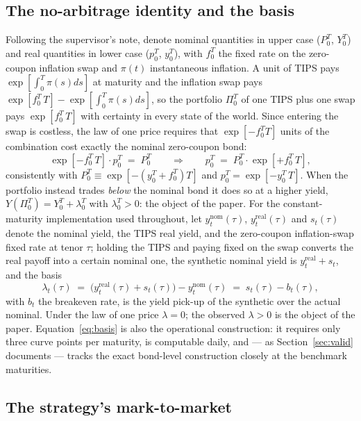 \documentclass[11pt]{article}
\begin{document}
\subsection{The no-arbitrage identity and the basis}

Following the supervisor's note, denote nominal quantities in upper case ($P_0^T$, $Y_0^T$) and real quantities in lower case ($p_0^T$, $y_0^T$), with $f_0^T$ the fixed rate on the zero-coupon inflation swap and $\pi(t)$ instantaneous inflation. A unit of TIPS pays $\exp[\int_0^T\pi(s)ds]$ at maturity and the inflation swap pays $\exp[f_0^T\,T]-\exp[\int_0^T\pi(s)ds]$, so the portfolio $\Pi_0^T$ of one TIPS plus one swap pays $\exp[f_0^T\,T]$ with certainty in every state of the world. Since entering the swap is costless, the law of one price requires that $\exp[-f_0^T T]$ units of the combination cost exactly the nominal zero-coupon bond:
\begin{equation}
\exp\!\left[-f_0^T\,T\right]\cdot p_0^T \;=\; P_0^T
\qquad\Longrightarrow\qquad
p_0^T \;=\; P_0^T\cdot\exp\!\left[+f_0^T\,T\right],
\label{eq:loop}
\end{equation}
consistently with $P_0^T\equiv\exp[-(y_0^T+f_0^T)T]$ and $p_0^T=\exp[-y_0^T\,T]$. When the portfolio instead trades \emph{below} the nominal bond it does so at a higher yield, $Y(\Pi_0^T)=Y_0^T+\lambda_0^T$ with $\lambda_0^T>0$: the object of the paper. For the constant-maturity implementation used throughout, let $y^{\text{nom}}_t(\tau)$, $y^{\text{real}}_t(\tau)$ and $s_t(\tau)$ denote the nominal yield, the TIPS real yield, and the zero-coupon inflation-swap fixed rate at tenor $\tau$; holding the TIPS and paying fixed on the swap converts the real payoff into a certain nominal one, the synthetic nominal yield is $y^{\text{real}}_t+s_t$, and the basis
\begin{equation}
\lambda_t(\tau) \;=\; \big(y^{\text{real}}_t(\tau)+s_t(\tau)\big)-y^{\text{nom}}_t(\tau) \;=\; s_t(\tau)-b_t(\tau),
\label{eq:basis}
\end{equation}
with $b_t$ the breakeven rate, is the yield pick-up of the synthetic over the actual nominal. Under the law of one price $\lambda=0$; the observed $\lambda>0$ is the object of the paper. Equation~\eqref{eq:basis} is also the operational construction: it requires only three curve points per maturity, is computable daily, and --- as Section~\ref{sec:valid} documents --- tracks the exact bond-level construction closely at the benchmark maturities.

\subsection{The strategy's mark-to-market}
\end{document}

